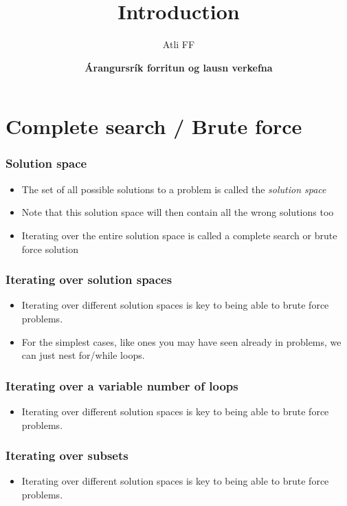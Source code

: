 \documentclass{beamer}
\title{Introduction}
\author{Atli FF}
\institute{\href{http://ru.is/td}{School of Computer Science} \\[2pt] \href{http://ru.is}{Reykjavík University}}
\date{\textbf{Árangursrík forritun og lausn verkefna}}
\begin{document}
\begin{frame}[plain]
    \titlepage
\end{frame}

\section*{Complete search / Brute force}

\begin{frame}[plain]
	\frametitle{Solution space}
	\begin{itemize}
		 \item The set of all possible solutions to a problem is called the \textit{solution space}
		 \item Note that this solution space will then contain all the wrong solutions too
		 \item Iterating over the entire solution space is called a complete search or brute force solution
	\end{itemize}
\end{frame}

\begin{frame}[plain]
	\frametitle{Iterating over solution spaces}
	\begin{itemize}
		 \item Iterating over different solution spaces is key to being able to brute force problems.
		 \item For the simplest cases, like ones you may have seen already in problems, we can just nest for/while loops.
	\end{itemize}
\end{frame}

\begin{frame}[plain]
	\frametitle{Iterating over a variable number of loops}
	\begin{itemize}
		 \item Iterating over different solution spaces is key to being able to brute force problems.
	\end{itemize}
\end{frame}

\begin{frame}[plain]
	\frametitle{Iterating over subsets}
	\begin{itemize}
		 \item Iterating over different solution spaces is key to being able to brute force problems.
	\end{itemize}
\end{frame}
\end{document}
